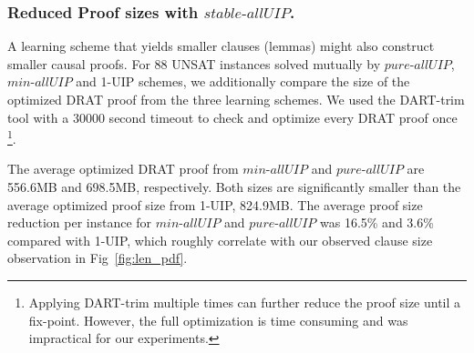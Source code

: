 \documentclass[runningheads]{llncs}
\newcommand{\allUip}{\textit{stable-allUIP}}
\newcommand{\allUipPure}{\textit{pure-allUIP}\xspace}
\newcommand{\allUipMin}{\textit{min-allUIP}\xspace}
\newcommand{\MapleBase}{\textit{MapleCOMSPS\_LRB}}
\newcommand{\MapleIUIPPure}{\text{Maple-\allUipPure}}
\newcommand{\MapleIUIMin}{\text{Maple-\allUipMin}}
\begin{document}
\subsubsection{Reduced Proof sizes with $\allUip$.}
A learning scheme that yields smaller clauses (lemmas) might also
construct smaller causal proofs. For 88 UNSAT instances solved mutually
by $\allUipPure$, $\allUipMin$ and 1-UIP schemes, we additionally
compare the size of the optimized DRAT proof from the three learning schemes. 
We used the DART-trim tool
\cite{DBLP:conf/sat/WetzlerHH14} with a 30000 second timeout to check and
optimize every DRAT proof once \footnote{Applying DART-trim multiple
  times can further reduce the proof size until a fix-point. However,
  the full optimization is time consuming and was impractical for our
  experiments.}.

The average optimized DRAT proof from $\allUipMin$ and $\allUipPure$
are 556.6MB and 698.5MB, respectively. Both sizes are significantly
smaller than the average optimized proof size from 1-UIP, 824.9MB.
The average proof size reduction per instance for $\allUipMin$ and
$\allUipPure$ was 16.5\% and 3.6\% compared with 1-UIP, which roughly
correlate with our observed clause size observation in
Fig~\ref{fig:len_pdf}.


\end{document}
